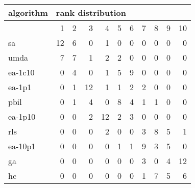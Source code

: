 \begin{tabular}{@{}l*{10}{r}@{}}
\toprule
algorithm & \multicolumn{10}{l}{{rank distribution}}\\
\midrule
& 1 & 2 & 3 & 4 & 5 & 6 & 7 & 8 & 9 & 10\\
\midrule
sa & 12 & 6 & 0 & 1 & 0 & 0 & 0 & 0 & 0 & 0\\
umda & 7 & 7 & 1 & 2 & 2 & 0 & 0 & 0 & 0 & 0\\
ea-1c10 & 0 & 4 & 0 & 1 & 5 & 9 & 0 & 0 & 0 & 0\\
ea-1p1 & 0 & 1 & 12 & 1 & 1 & 2 & 2 & 0 & 0 & 0\\
pbil & 0 & 1 & 4 & 0 & 8 & 4 & 1 & 1 & 0 & 0\\
ea-1p10 & 0 & 0 & 2 & 12 & 2 & 3 & 0 & 0 & 0 & 0\\
rls & 0 & 0 & 0 & 2 & 0 & 0 & 3 & 8 & 5 & 1\\
ea-10p1 & 0 & 0 & 0 & 0 & 1 & 1 & 9 & 3 & 5 & 0\\
ga & 0 & 0 & 0 & 0 & 0 & 0 & 3 & 0 & 4 & 12\\
hc & 0 & 0 & 0 & 0 & 0 & 0 & 1 & 7 & 5 & 6\\
\bottomrule
\end{tabular}

